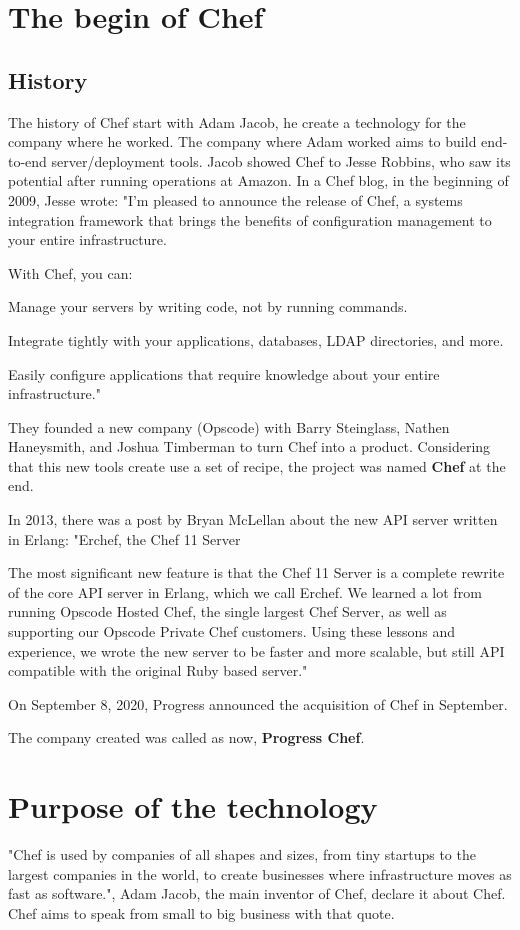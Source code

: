 \documentclass[12pt,a4paper,openright,twoside]{book}
\begin{document}
\section{The begin of Chef}

\subsection{History}
The history of Chef start with  Adam Jacob, he create a technology for the company where he worked.
The company where Adam worked aims to build end-to-end server/deployment tools. Jacob showed Chef to Jesse Robbins, who saw its potential after running operations at Amazon.
In a Chef blog, in the beginning of 2009, Jesse wrote:
"I’m pleased to announce the release of Chef, a systems integration framework that brings the benefits of configuration management to your entire infrastructure.

With Chef, you can:

Manage your servers by writing code, not by running commands. 


Integrate tightly with your applications, databases, LDAP directories, and more.


Easily configure applications that require knowledge about your entire infrastructure."\cite{chefStory}

They founded a new company (Opscode) with Barry Steinglass, Nathen Haneysmith, and Joshua Timberman to turn Chef into a product.
Considering that this new tools create use a set of recipe, the project was named \textbf{Chef} at the end.

In 2013, there was a post by Bryan McLellan about the new API server written in Erlang:
"Erchef, the Chef 11 Server


The most significant new feature is that the Chef 11 Server is a complete rewrite of the core API server in Erlang, which we call Erchef.
We learned a lot from running Opscode Hosted Chef, the single largest Chef Server, as well as supporting our Opscode Private Chef customers.
Using these lessons and experience, we wrote the new server to be faster and more scalable, but still API compatible with the original Ruby based server."\cite{chefStory2}


On September 8, 2020, Progress announced the acquisition of Chef in September.\cite{chefStory3}


The company created was called as now, \textbf{Progress Chef}.



\section{Purpose of the technology}
"Chef is used by companies of all shapes and sizes, from tiny startups to the largest companies in the world, to create businesses where infrastructure moves as fast as software.", Adam Jacob, the main inventor of Chef, declare it about Chef.
Chef aims to speak from small to big business with that quote.
\end{document}
